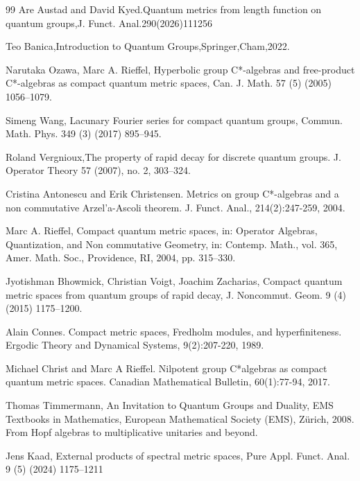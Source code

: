 \documentclass[12pt, reqno]{amsart}
\theoremstyle{definition}
\theoremstyle{remark}
\numberwithin{equation}{section}
\begin{document}
\begin{thebibliography}{99}
Are Austad and David Kyed.Quantum metrics from length function on quantum groups,J. Funct. Anal.290(2026)111256

Teo Banica,Introduction to Quantum Groups,Springer,Cham,2022.

Narutaka Ozawa, Marc A. Rieffel, Hyperbolic group C*-algebras and free-product C*-algebras as compact quantum metric spaces, Can. J. Math. 57 (5) (2005) 1056--1079.

Simeng Wang, Lacunary Fourier series for compact quantum groups, Commun. Math. Phys. 349 (3)
(2017) 895--945.

Roland Vergnioux,The property of rapid decay for discrete quantum groups.
J. Operator Theory 57 (2007), no. 2, 303–324.

Cristina Antonescu and Erik Christensen. Metrics on group C*-algebras and a non commutative Arzel'a-Ascoli theorem. J. Funct. Anal., 214(2):247-259, 2004.

Marc A. Rieffel, Compact quantum metric spaces, in: Operator Algebras, Quantization, and Non commutative Geometry, in: Contemp. Math., vol. 365, Amer. Math. Soc., Providence, RI, 2004,
pp. 315--330.

Jyotishman Bhowmick, Christian Voigt, Joachim Zacharias, Compact quantum metric spaces from quantum groups of rapid decay, J. Noncommut. Geom. 9 (4) (2015) 1175--1200.

Alain Connes. Compact metric spaces, Fredholm modules, and hyperfiniteness. Ergodic Theory and Dynamical Systems, 9(2):207-220, 1989.

Michael Christ and Marc A Rieffel. Nilpotent group C*algebras as compact quantum metric spaces. Canadian Mathematical Bulletin, 60(1):77-94, 2017.

Thomas Timmermann, An Invitation to Quantum Groups and Duality, EMS Textbooks in Mathematics, European Mathematical Society (EMS), Zürich, 2008. From Hopf algebras to multiplicative unitaries and beyond.

Jens Kaad, External products of spectral metric spaces, Pure Appl. Funct. Anal. 9 (5) (2024)
1175--1211


\end{thebibliography}
\end{document}
